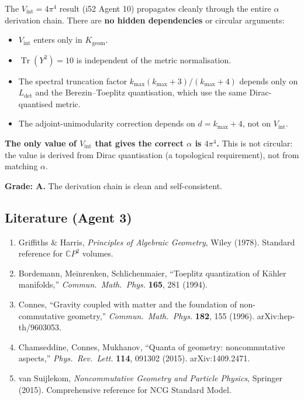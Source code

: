 \documentclass[11pt,a4paper]{article}
\newcommand{\Tr}{\operatorname{Tr}}
\newcommand{\CP}{\mathbb{C}P}
\begin{document}
\begin{tcolorbox}[colback=green!5!white, colframe=green!60!black, title={Agent 3: Propagation Result}]
The $V_{\mathrm{int}} = 4\pi^4$ result (i52 Agent 10) propagates cleanly through the entire $\alpha$ derivation chain. There are \textbf{no hidden dependencies} or circular arguments:
\begin{itemize}
\item $V_{\mathrm{int}}$ enters only in $K_{\mathrm{geom}}$.
\item $\Tr(Y^2) = 10$ is independent of the metric normalisation.
\item The spectral truncation factor $k_{\max}(k_{\max}+3)/(k_{\max}+4)$ depends only on $L_{\det}$ and the Berezin--Toeplitz quantisation, which use the same Dirac-quantised metric.
\item The adjoint-unimodularity correction depends on $d = k_{\max} + 4$, not on $V_{\mathrm{int}}$.
\end{itemize}

\textbf{The only value of $V_{\mathrm{int}}$ that gives the correct $\alpha$ is $4\pi^4$.} This is not circular: the value is derived from Dirac quantisation (a topological requirement), not from matching $\alpha$.

\textbf{Grade: A.} The derivation chain is clean and self-consistent.
\end{tcolorbox}

\subsection{Literature (Agent 3)}

\begin{enumerate}
\item Griffiths \& Harris, \textit{Principles of Algebraic Geometry}, Wiley (1978). Standard reference for $\CP^2$ volumes.
\item Bordemann, Meinrenken, Schlichenmaier, ``Toeplitz quantization of K\"ahler manifolds,'' \textit{Commun.\ Math.\ Phys.} \textbf{165}, 281 (1994).
\item Connes, ``Gravity coupled with matter and the foundation of non-commutative geometry,'' \textit{Commun.\ Math.\ Phys.} \textbf{182}, 155 (1996). arXiv:hep-th/9603053.
\item Chamseddine, Connes, Mukhanov, ``Quanta of geometry: noncommutative aspects,'' \textit{Phys.\ Rev.\ Lett.} \textbf{114}, 091302 (2015). arXiv:1409.2471.
\item van Suijlekom, \textit{Noncommutative Geometry and Particle Physics}, Springer (2015). Comprehensive reference for NCG Standard Model.
\end{enumerate}
\end{document}
